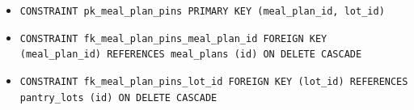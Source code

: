 \begin{itemize}
\item \raggedright {\small\texttt{CONSTRAINT pk\_\allowbreak{}\allowbreak{}meal\_\allowbreak{}\allowbreak{}plan\_\allowbreak{}\allowbreak{}pins PRIMARY KEY (meal\_\allowbreak{}\allowbreak{}plan\_\allowbreak{}\allowbreak{}id, lot\_\allowbreak{}\allowbreak{}id)}}
\item \raggedright {\small\texttt{CONSTRAINT fk\_\allowbreak{}\allowbreak{}meal\_\allowbreak{}\allowbreak{}plan\_\allowbreak{}\allowbreak{}pins\_\allowbreak{}\allowbreak{}meal\_\allowbreak{}\allowbreak{}plan\_\allowbreak{}\allowbreak{}id FOREIGN KEY (meal\_\allowbreak{}\allowbreak{}plan\_\allowbreak{}\allowbreak{}id) REFERENCES meal\_\allowbreak{}\allowbreak{}plans (id) ON DELETE CASCADE}}
\item \raggedright {\small\texttt{CONSTRAINT fk\_\allowbreak{}\allowbreak{}meal\_\allowbreak{}\allowbreak{}plan\_\allowbreak{}\allowbreak{}pins\_\allowbreak{}\allowbreak{}lot\_\allowbreak{}\allowbreak{}id FOREIGN KEY (lot\_\allowbreak{}\allowbreak{}id) REFERENCES pantry\_\allowbreak{}\allowbreak{}lots (id) ON DELETE CASCADE}}
\end{itemize}
